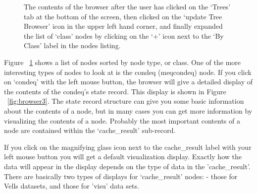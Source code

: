 \documentclass[10pt]{article}
\begin{document}
\begin{figure}
{\par\centering
{}
\par}
\caption {The contents of the browser after the user has clicked on the
`Trees' tab at the bottom of the screen, then clicked on the 
`update Tree Browser' icon in the upper left hand corner, and finally
expanded the list of `class' nodes by clicking on the `+' icon next to
the `By Class' label in the nodes listing.}
\label{fig:browser2}
\end{figure}

Figure  ~\ref{fig:browser2} shows a list of nodes sorted by node type, or
class. One of the more interesting types of nodes to look at is the 
condeq (meqcondeq) node. If you click on `condeq' with the left mouse
button, the browser will give a detailed display of the contents of the
condeq's state record. This display is shown in Figure ~\ref{fig:browser3}.
The state record structure can give you some basic information about
the contents of a node, but in many cases you can get more information
by visualizing the contents of a node. Probably the most important
contents of a node are contained within the `cache\_result' sub-record.

If you click on the magnifying glass icon next to the cache\_result
label with your left mouse button you will get a default visualization
display. Exactly how the data will appear in the display depends
on the type of data in the 'cache\_result'. 
There are basically
two types of displays for `cache\_result' nodes: - those for Vells datasets, 
and those for 'visu' data sets. 
\end{document}
